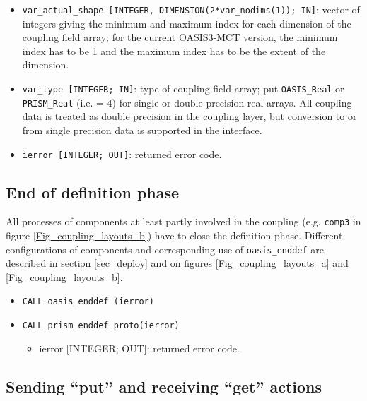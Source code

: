 \begin{itemize}
\begin{itemize}
  \item {\tt var\_actual\_shape [INTEGER, DIMENSION(2*var\_nodims(1));
      IN]}: vector of integers giving the minimum and maximum index
    for each dimension of the coupling field array; for the current
    OASIS3-MCT version, the minimum index has to be 1 and the maximum
    index has to be the extent of the dimension.
  \item {\tt var\_type [INTEGER; IN]}: type of coupling field array;
    put {\tt OASIS\_Real} or {\tt PRISM\_Real} (i.e. = 4) for single
    or double precision real arrays.  All coupling data is treated as
    double precision in the coupling layer, but conversion to or from
    single precision data is supported in the interface.
  \item {\tt ierror [INTEGER; OUT]}: returned error code.
  \end{itemize}
\end{itemize}

\subsection{End of definition phase}
\label{subsubsec_Endofdefinition}
All processes of components at least partly involved in the coupling (e.g. {\tt comp3} in figure
    \ref{Fig_coupling_layouts_b}) have to close the definition phase. Different configurations of components and corresponding use of {\tt oasis\_enddef} are described in section \ref{sec_deploy} and on figures \ref{Fig_coupling_layouts_a} and \ref{Fig_coupling_layouts_b}.
\begin{itemize}
\item {\tt CALL oasis\_enddef (ierror)}
\item {\tt CALL prism\_enddef\_proto(ierror)}
  \begin{itemize}
  \item ierror [INTEGER; OUT]: returned error code.
  \end{itemize}
\end{itemize}


\subsection{Sending ``put'' and receiving ``get'' actions}
\label{subsubsec_sendingreceiving}

